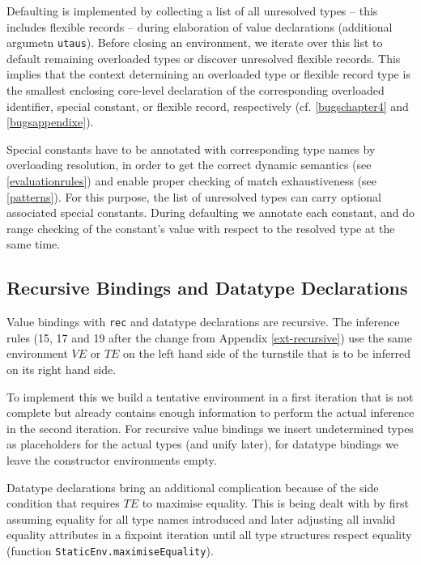 \documentclass[twoside,titlepage]{article}
\begin{document}
Defaulting is implemented by collecting a list of all unresolved types -- this includes flexible records -- during elaboration of value declarations (additional argumetn {\tt utaus}). Before closing an environment, we iterate over this list to default remaining overloaded types or discover unresolved flexible records. This implies that the context determining an overloaded type or flexible record type is the smallest enclosing core-level declaration of the corresponding overloaded identifier, special constant, or flexible record, respectively (cf. \ref{bugschapter4} and \ref{bugsappendixe}).

Special constants have to be annotated with corresponding type names by overloading resolution, in order to get the correct dynamic semantics (see \ref{evaluationrules}) and enable proper checking of match exhaustiveness (see \ref{patterns}). For this purpose, the list of unresolved types can carry optional associated special constants. During defaulting we annotate each constant, and do range checking of the constant's value with respect to the resolved type at the same time.


\subsection{Recursive Bindings and Datatype Declarations}
\label{recursive}
\label{datatype}

Value bindings with {\tt rec} and datatype declarations are recursive. The inference rules (15, 17 and 19 after the change from Appendix \ref{ext-recursive}) use the same environment $\mathit{VE}$ or $\mathit{TE}$ on the left hand side of the turnstile that is to be inferred on its right hand side.

To implement this we build a tentative environment in a first iteration that is not complete but already contains enough information to perform the actual inference in the second iteration. For recursive value bindings we insert undetermined types as placeholders for the actual types (and unify later), for datatype bindings we leave the constructor environments empty.

Datatype declarations bring an additional complication because of the side condition that requires $\mathit{TE}$ to maximise equality. This is being dealt with by first assuming equality for all type names introduced and later adjusting all invalid equality attributes in a fixpoint iteration until all type structures respect equality (function {\tt StaticEnv.maximiseEquality}).
\end{document}
